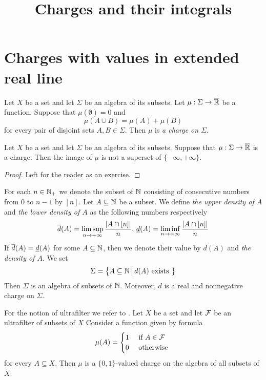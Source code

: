 



\title{Charges and their integrals}
\date{}
\maketitle


\section{Charges with values in extended real line}

\begin{definition}
    Let $X$ be a set and let $\Sigma$ be an algebra of its subsets. Let $\mu:\Sigma \rightarrow \overline{{\mathbb R}}$ be a function. Suppose that $\mu(\emptyset) = 0$ and
    $$\mu(A \cup B) = \mu(A) + \mu(B)$$
    for every pair of disjoint sets $A,B \in \Sigma$. Then $\mu$ is \textit{a charge on $\Sigma$}.
\end{definition}

\begin{fact}\label{fact:one_side_infinity_only_for_finitely_additive}
    Let $X$ be a set and let $\Sigma$ be an algebra of its subsets. Suppose that $\mu:\Sigma \rightarrow \overline{{\mathbb R}}$ is a charge. Then the image of $\mu$ is not a superset of $\{-\infty,+\infty\}$.
\end{fact}
\begin{proof}
    Left for the reader as an exercise.
\end{proof}

\begin{example}\label{example:natural_density_charge}
    For each $n \in {\mathbb N}_+$ we denote the subset of ${\mathbb N}$ consisting of consecutive numbers from $0$ to $n-1$ by $[n]$. Let $A \subseteq {\mathbb N}$ be a subset. We define \textit{the upper density of $A$} and \textit{the lower density of $A$} as the following numbers respectively
    $$\overline{d}(A) = \limsup_{n\rightarrow +\infty}\frac{|A\cap [n]|}{n},\,\underline{d}(A) = \liminf_{n\rightarrow +\infty}\frac{|A\cap [n]|}{n}$$
    If $\overline{d}(A) = \underline{d}(A)$ for some $A \subseteq {\mathbb N}$, then we denote their value by $d(A)$ and \textit{the density of $A$}. We set
    $$\Sigma = \big\{A\subseteq {\mathbb N}\,\big|\,d(A)\mbox{ exists }\big\}$$
    Then $\Sigma$ is an algebra of subsets of ${\mathbb N}$. Moreover, $d$ is a real and nonnegative charge on $\Sigma$.
\end{example}

\begin{example}\label{example:ultrafilter_charge}
    For the notion of ultrafilter we refer to \cite{Filters_in_topology}. Let $X$ be a set and let ${\mathcal F}$ be an ultrafilter of subsets of $X$  Consider a function given by formula
    $$\mu(A) = \begin{cases}
            1 & \mbox{ if }A \in {\mathcal F} \\
            0 & \mbox{ otherwise }   \\
        \end{cases}
    $$
    for every $A \subseteq X$. Then $\mu$ is a $\{0,1\}$-valued charge on the algebra of all subsets of $X$.
\end{example}

